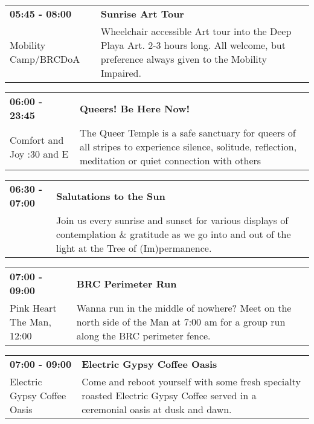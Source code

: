 \begin{tabular}{ p{1in} p{2.2in} }
    \textbf{05:45 - 08:00} & \textbf{Sunrise Art Tour} \\
    Mobility Camp/BRCDoA \newline  & Wheelchair accessible Art tour into the Deep Playa Art.
2-3 hours long. All welcome, but preference always given to the Mobility Impaired. \\
    \hline 
\end{tabular}
    
\begin{tabular}{ p{1in} p{2.2in} }
    \textbf{06:00 - 23:45} & \textbf{Queers! Be Here Now!} \\
    Comfort and Joy \newline 7:30 and E & The Queer Temple is a safe sanctuary for queers of all stripes to experience silence, solitude, reflection, meditation or quiet connection with others \\
    \hline 
\end{tabular}
    
\begin{tabular}{ p{1in} p{2.2in} }
    \textbf{06:30 - 07:00} & \textbf{Salutations to the Sun} \\
    ~ \newline  & Join us every sunrise and sunset for various displays of contemplation \& gratitude as we go into and out of the light at the Tree of (Im)permanence. \\
    \hline 
\end{tabular}
    
\begin{tabular}{ p{1in} p{2.2in} }
    \textbf{07:00 - 09:00} & \textbf{BRC Perimeter Run} \\
    Pink Heart \newline The Man, 12:00 & Wanna run in the middle of nowhere? Meet on the north side of the Man at 7:00 am for a group run along the BRC perimeter fence. \\
    \hline 
\end{tabular}
    
\begin{tabular}{ p{1in} p{2.2in} }
    \textbf{07:00 - 09:00} & \textbf{Electric Gypsy Coffee Oasis} \\
    Electric Gypsy Coffee Oasis \newline  & Come and reboot yourself with some fresh specialty roasted Electric Gypsy Coffee served in a ceremonial oasis at dusk and dawn. \\
    \hline 
\end{tabular}
    
